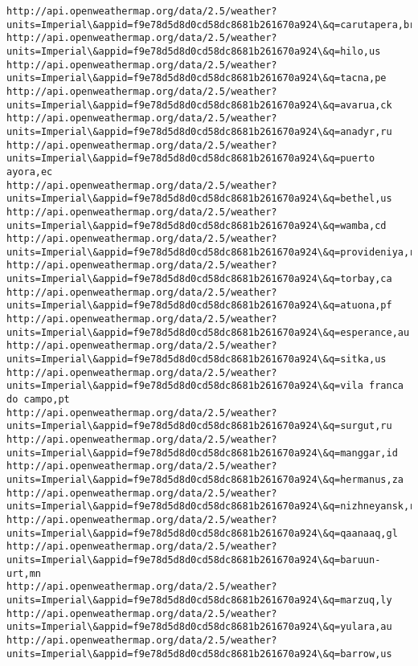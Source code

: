 \documentclass[11pt]{article}
\begin{document}
\begin{Verbatim}[commandchars=\\\{\}]
http://api.openweathermap.org/data/2.5/weather?units=Imperial\&appid=f9e78d5d8d0cd58dc8681b261670a924\&q=carutapera,br
http://api.openweathermap.org/data/2.5/weather?units=Imperial\&appid=f9e78d5d8d0cd58dc8681b261670a924\&q=hilo,us
http://api.openweathermap.org/data/2.5/weather?units=Imperial\&appid=f9e78d5d8d0cd58dc8681b261670a924\&q=tacna,pe
http://api.openweathermap.org/data/2.5/weather?units=Imperial\&appid=f9e78d5d8d0cd58dc8681b261670a924\&q=avarua,ck
http://api.openweathermap.org/data/2.5/weather?units=Imperial\&appid=f9e78d5d8d0cd58dc8681b261670a924\&q=anadyr,ru
http://api.openweathermap.org/data/2.5/weather?units=Imperial\&appid=f9e78d5d8d0cd58dc8681b261670a924\&q=puerto ayora,ec
http://api.openweathermap.org/data/2.5/weather?units=Imperial\&appid=f9e78d5d8d0cd58dc8681b261670a924\&q=bethel,us
http://api.openweathermap.org/data/2.5/weather?units=Imperial\&appid=f9e78d5d8d0cd58dc8681b261670a924\&q=wamba,cd
http://api.openweathermap.org/data/2.5/weather?units=Imperial\&appid=f9e78d5d8d0cd58dc8681b261670a924\&q=provideniya,ru
http://api.openweathermap.org/data/2.5/weather?units=Imperial\&appid=f9e78d5d8d0cd58dc8681b261670a924\&q=torbay,ca
http://api.openweathermap.org/data/2.5/weather?units=Imperial\&appid=f9e78d5d8d0cd58dc8681b261670a924\&q=atuona,pf
http://api.openweathermap.org/data/2.5/weather?units=Imperial\&appid=f9e78d5d8d0cd58dc8681b261670a924\&q=esperance,au
http://api.openweathermap.org/data/2.5/weather?units=Imperial\&appid=f9e78d5d8d0cd58dc8681b261670a924\&q=sitka,us
http://api.openweathermap.org/data/2.5/weather?units=Imperial\&appid=f9e78d5d8d0cd58dc8681b261670a924\&q=vila franca do campo,pt
http://api.openweathermap.org/data/2.5/weather?units=Imperial\&appid=f9e78d5d8d0cd58dc8681b261670a924\&q=surgut,ru
http://api.openweathermap.org/data/2.5/weather?units=Imperial\&appid=f9e78d5d8d0cd58dc8681b261670a924\&q=manggar,id
http://api.openweathermap.org/data/2.5/weather?units=Imperial\&appid=f9e78d5d8d0cd58dc8681b261670a924\&q=hermanus,za
http://api.openweathermap.org/data/2.5/weather?units=Imperial\&appid=f9e78d5d8d0cd58dc8681b261670a924\&q=nizhneyansk,ru
http://api.openweathermap.org/data/2.5/weather?units=Imperial\&appid=f9e78d5d8d0cd58dc8681b261670a924\&q=qaanaaq,gl
http://api.openweathermap.org/data/2.5/weather?units=Imperial\&appid=f9e78d5d8d0cd58dc8681b261670a924\&q=baruun-urt,mn
http://api.openweathermap.org/data/2.5/weather?units=Imperial\&appid=f9e78d5d8d0cd58dc8681b261670a924\&q=marzuq,ly
http://api.openweathermap.org/data/2.5/weather?units=Imperial\&appid=f9e78d5d8d0cd58dc8681b261670a924\&q=yulara,au
http://api.openweathermap.org/data/2.5/weather?units=Imperial\&appid=f9e78d5d8d0cd58dc8681b261670a924\&q=barrow,us

\end{Verbatim}
\end{document}
